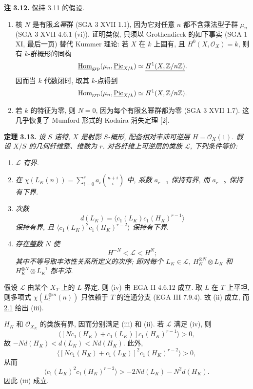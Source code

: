 \textbf{注 3.12.} 保持 3.11 的假设.
\begin{enumerate}[label=(\roman*)]
\item 核 \(N\) 是有限\emph{幺幂}群 (SGA 3 XVII 1.1), 因为它对任意 \(n\) 都不含乘法型子群 \(\mu_n\) (SGA 3 XVII 4.6.1 (vi)). 证明类似, 只须以 Grothendieck 的如下事实 (SGA 1 XI, 最后一页) 替代 Kummer 理论: 若 \(X\) 在 \(k\) 上固有, 且 \(H^0(X,\mathcal O_X)=k\), 则有 \(k\)-群概形的同构
\[
\underline{\operatorname{Hom}}_{\mathrm{grp}}
(\mu_n,\underline{\operatorname{Pic}}_{X/k})
\simeq \underline{H^1(X,\mathbb Z/n\mathbb Z)}.
\]
因而当 \(k\) 代数闭时, 取其 \(k\)-点得到
\[
\operatorname{Hom}_{\mathrm{grp}}(\mu_n,\underline{\operatorname{Pic}}_{X/k})
\simeq H^1(X,\mathbb Z/n\mathbb Z).
\]
\item 若 \(k\) 的特征为零, 则 \(N=0\), 因为每个有限幺幂群都为零 (SGA 3 XVII 1.7). 这几乎恢复了 Mumford 形式的 Kodaira 消失定理 [2].
\end{enumerate}

\textbf{定理 3.13.} \emph{设 \(S\) 诺特, \(X\) 是射影 \(S\)-概形, 配备相对丰沛可逆层 \(H=\mathcal O_X(1)\). 假设 \(X/S\) 的几何纤维整、维数为 \(r\). 对各纤维上可逆层的类族 \(\mathscr L\), 下列条件等价:}
\begin{enumerate}[label=(\roman*)]
\item \emph{\(\mathscr L\) 有界.}
\item \emph{在 \(\chi(L_K(n))=\sum_{i=0}^{r}a_i\binom{n+i}{i}\) 中, 系数 \(a_{r-1}\) 保持有界, 而 \(a_{r-2}\) 保持有下界.}
\item \emph{次数
\[
d(L_K)=\langle c_1(L_K)c_1(H_K)^{r-1}\rangle
\]
保持有界, 且 \(\langle c_1(L_K)^2c_1(H_K)^{r-2}\rangle\) 保持有下界.}
\item \emph{存在整数 \(N\) 使
\[
H^{-N}<\mathscr L<H^N;
\]
其中不等号取丰沛性关系所定义的次序; 即对每个 \(L_K\in\mathscr L\), \(H_K^{\otimes N}\otimes L_K\) 和 \(H_K^{\otimes N}\otimes L_K^{-1}\) 都丰沛.}
\end{enumerate}

假设 \(\mathscr L\) 由某个 \(X_T\) 上的 \(L\) 界定. 则 (iv) 由 EGA II 4.6.12 成立. 取 \(L\) 在 \(T\) 上平坦, 则多项式 \(\chi(L_t^{\otimes m}(n))\) 只依赖于 \(T\) 的连通分支 (EGA III 7.9.4). 故 (ii) 成立, 而\hyperlink{sga6.e13.para.2-1}{2.1} 给出 (iii).

\(H_K\) 和 \(\mathcal O_{X_K}\) 的类族有界, 因而分别满足 (iii) 和 (ii). 若 \(\mathscr L\) 满足 (iv), 则
\[
\langle[Nc_1(H_K)+c_1(L_K)]c_1(H_K)^{r-1}\rangle>0,
\]
故 \(-Nd(H_K)<d(L_K)<Nd(H_K)\). 此外,
\[
\langle[Nc_1(H_K)+c_1(L_K)]^2c_1(H_K)^{r-2}\rangle>0,
\]
从而
\[
\langle c_1(L_K)^2c_1(H_K)^{r-2}\rangle
>-2Nd(L_K)-N^2d(H_K).
\]
因此 (iii) 成立.

